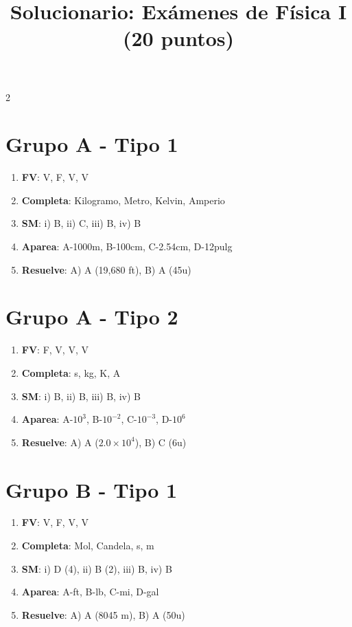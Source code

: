 \documentclass[a4paper,12pt]{article}
\title{Solucionario: Exámenes de Física I (20 puntos)}
\date{}
\begin{document}
\maketitle

\begin{multicols}{2}

\section*{Grupo A - Tipo 1}
\begin{enumerate}
    \item \textbf{FV}: V, F, V, V
    \item \textbf{Completa}: Kilogramo, Metro, Kelvin, Amperio
    \item \textbf{SM}: i) B, ii) C, iii) B, iv) B
    \item \textbf{Aparea}: A-1000m, B-100cm, C-2.54cm, D-12pulg
    \item \textbf{Resuelve}: A) A (19,680 ft), B) A (45u)
\end{enumerate}

\section*{Grupo A - Tipo 2}
\begin{enumerate}
    \item \textbf{FV}: F, V, V, V
    \item \textbf{Completa}: s, kg, K, A
    \item \textbf{SM}: i) B, ii) B, iii) B, iv) B
    \item \textbf{Aparea}: A-$10^3$, B-$10^{-2}$, C-$10^{-3}$, D-$10^6$
    \item \textbf{Resuelve}: A) A ($2.0 \times 10^4$), B) C (6u)
\end{enumerate}

\columnbreak

\section*{Grupo B - Tipo 1}
\begin{enumerate}
    \item \textbf{FV}: V, F, V, V
    \item \textbf{Completa}: Mol, Candela, s, m
    \item \textbf{SM}: i) D (4), ii) B (2), iii) B, iv) B
    \item \textbf{Aparea}: A-ft, B-lb, C-mi, D-gal
    \item \textbf{Resuelve}: A) A (8045 m), B) A (50u)
\end{enumerate}


\end{multicols}
\end{document}
